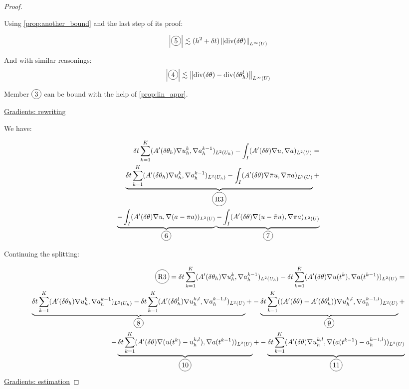 \documentclass[english,a4paper,9pt,oneside]{scrbook}	%
\theoremstyle{break}
\newenvironment{mproof}[1][\proofname]{%
  \begin{proof}[#1]$ $\par\nobreak\ignorespaces
}{%
  \end{proof}
}
\renewcommand*{\proofname}{Proof}
\theoremstyle{remark}
\newcommand{\norm}[1]{\left\lVert#1\right\rVert}
\newcommand{\te}{\theta}
\newcommand{\dive}{\text{div}}
\newcommand*\circled[1]{\tikz[baseline=(char.base)]{
            \node[shape=circle,draw,inner sep=2pt] (char) {#1};}}
\begin{document}
\begin{mproof}
Using \cref{prop:another_bound} and the last step of its proof:

\begin{align*}
	\left |\circled{5}\right|\lesssim (h^2+\delta t)  \norm{\dive(\delta \te)}_{L^\infty(U)}
\end{align*}

And with similar reasonings:
\begin{align*}
	\left |\circled{4}\right|\lesssim \norm{\dive(\delta \te) - \dive(\delta \te_h^l)}_{L^\infty(U)}
\end{align*}

Member $\circled{3}$ can be bound with the help of \cref{prop:lin_appr}.

\underline{Gradients: rewriting}

We have:

\begin{align*}
	\delta t \sum_{k=1}^{K} (A'(\delta \theta_h ) \nabla u_h^k, \nabla a_h^{k-1})_{L^2(U_h)} - \int_I (A'(\delta\te )\nabla u, \nabla a)_{L^2(U)} = \\
	\underbrace{\delta t \sum_{k=1}^{K} (A'(\delta \theta_h ) \nabla u_h^k, \nabla a_h^{k-1})_{L^2(U_h)}- \int_I (A'(\delta\te )\nabla\tilde{\pi}u, \nabla \pi a)_{L^2(U)}}_{\circled{R3}} + \\\underbrace{- \int_I (A'(\delta\te )\nabla u, \nabla (a-\pi a))_{L^2(U)}}_{\circled{6}}\underbrace{- \int_I (A'(\delta\te )\nabla (u - \tilde{\pi}u), \nabla \pi a)_{L^2(U)}}_{\circled{7}} 
\end{align*}

Continuing the splitting:

\begin{align*}
\circled{R3} = \delta t \sum_{k=1}^{K} (A'(\delta \theta_h ) \nabla u_h^k, \nabla a_h^{k-1})_{L^2(U_h)} - \delta t \sum_{k=1}^{K} (A'(\delta\te )\nabla u(t^{k}) , \nabla a(t^{k-1}))_{L^2(U)} = \\
\underbrace{\delta t \sum_{k=1}^{K} (A'(\delta \theta_h ) \nabla u_h^k, \nabla a_h^{k-1})_{L^2(U_h)} - \delta t \sum_{k=1}^{K} (A'(\delta\te_h^l )\nabla u_h^{k,l} , \nabla a_h^{k-1,l})_{L^2(U)}}_{\circled{8}}+
- \underbrace{\delta t \sum_{k=1}^{K} ((A'(\delta \te) - A'(\delta\te_h^l ))\nabla u_h^{k,l} , \nabla a_h^{k-1,l})_{L^2(U)}}_{\circled{9}}+\\
- \underbrace{\delta t \sum_{k=1}^{K} (A'(\delta\te )\nabla (u(t^{k})-u_h^{k,l}) , \nabla a(t^{k-1}))_{L^2(U)}}_{\circled{10}}+
- \underbrace{\delta t \sum_{k=1}^{K} (A'(\delta\te )\nabla u_h^{k,l} , \nabla (a(t^{k-1}) -a_h^{k-1,l}))_{L^2(U)}}_{\circled{11}}
\end{align*}
\underline{Gradients: estimation}


\end{mproof}
\end{document}
